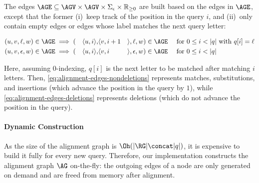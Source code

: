 \begin{samepage}
The edges $\AGE \subseteq \AGV \times \AGV \times \Sigma_\epsilon \times
\mathbb{R}_{\geq 0}$ are built based on the edges in $\AGE$, except that the
former (i)~keep track of the position in the query $i$, and (ii)~only contain
empty edges or edges
whose label matches the next query letter:

\vspace{-0.7em}
{%
\small
\begin{alignat}{10}
	(u,v,\ell,w) &\in \AGE \implies (&\langle u, i \rangle, &\langle v, i+1
		&&\rangle,\ell,w) \in \AGE \quad \text{ for } 0 \leq i < |q| \text{ with }
		q[i]=\ell \label{eq:alignment-edges-nondeletions} \\
	(u,v,\epsilon,w) &\in\AGE \implies (&\langle u, i \rangle, &\langle v, i
		&&\rangle,\epsilon,w) \in \AGE \quad \text{ for } 0 \leq i < |q| \label{eq:alignment-edges-deletions}
\end{alignat}
}%
\end{samepage}
%
Here, assuming $0$-indexing, $q[i]$ is the next letter to be matched after
matching $i$ letters. Then, \cref{eq:alignment-edges-nondeletions} represents
matches, substitutions, and insertions (which advance the position in the query
by $1$), while \cref{eq:alignment-edges-deletions} represents deletions (which do
not advance the position in the query).

\paragraph{Dynamic Construction}
As the size of the alignment graph is $\Oh(\lvert \RG \rvert \concat \lvert q
\rvert)$, it is expensive to build it fully for every new query.
Therefore, our implementation constructs the alignment graph $\AG$ on-the-fly:
the outgoing edges of a node are only generated on demand and are freed from
memory after alignment.
